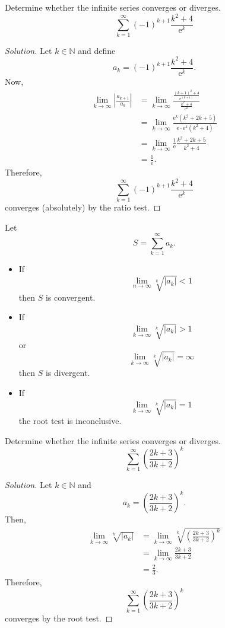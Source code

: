 \documentclass[compacto,10pt,comentarios]{aleph-notas}
\begin{document}
\begin{ejer}
    Determine whether the infinite series converges or diverges.
    $$
        \sum_{k=1}^{\infty} (-1)^{k+1} \frac{k^2+4}{\mathrm{e}^{k}}
    $$
\end{ejer}
\begin{proof}[Solution]
    Let $k \in \mathbb{N}$ and define
    $$
        a_k = (-1)^{k+1} \frac{k^2+4}{\mathrm{e}^{k}}.
    $$
    Now,
    \begin{align*}
        \lim_{k \to \infty} \left| \frac{a_{k+1}}{a_k} \right| 
        & = \lim_{k \to \infty} \frac{\frac{(k+1)^2+4}{\mathrm{e}^{(k+1)}}}{\frac{k^2+4}{\mathrm{e}^{k}}} \\
        & = \lim_{k \to \infty} \frac{\mathrm{e}^{k} (k^2 + 2k + 5)}{\mathrm{e} \cdot \mathrm{e}^{k} (k^2 + 4)} \\
        & = \lim_{k \to \infty} \frac{1}{\mathrm{e}} \frac{k^2 + 2k + 5}{k^2 + 4} \\
        & = \frac{1}{\mathrm{e}}.
    \end{align*}
    Therefore,
    $$
        \sum_{k=1}^{\infty} (-1)^{k+1} \frac{k^2+4}{\mathrm{e}^{k}}
    $$
    converges (absolutely) by the ratio test.
\end{proof}

\begin{defi}
    Let 
    $$
        S = \sum_{k=1}^{\infty} a_k.
    $$
    \begin{itemize}
        \item If 
        $$
            \lim_{n\to\infty}\sqrt[k]{|a_k|} < 1
        $$ then $S$ is convergent.
        \item If
        $$
            \lim_{k \to \infty} \sqrt[k]{|a_k|} > 1
        $$ 
        or 
        $$
            \lim_{k \to \infty} \sqrt[k]{|a_k|}=\infty
        $$
        then $S$ is divergent.
        \item
        If 
            $$
                \lim_{k \to \infty} \sqrt[k]{|a_k|}=1
            $$
        the root test is inconclusive. 
\end{itemize}
\end{defi}

\begin{ejer}
    Determine whether the infinite series converges or diverges.
    $$
        \sum_{k=1}^{\infty} \left( \frac{2k + 3}{3 k + 2} \right) ^ {k}
    $$
\end{ejer}
\begin{proof}[Solution]
    Let $k \in \mathbb{N}$ and
    $$
        a_k = \left( \frac{2k + 3}{3 k + 2} \right) ^ {k}.
    $$
    Then,
    \begin{align*}
        \lim_{k \to \infty} \sqrt[k]{|a_k|}
        & = \lim_{k \to \infty} \sqrt[k]{\left( \frac{2k + 3}{3 k + 2} \right) ^ {k}} \\
        & = \lim_{k \to \infty} \frac{2k + 3}{3 k + 2} \\
        & = \frac{2}{3}.
    \end{align*}
    Therefore, 
    $$
        \sum_{k=1}^{\infty} \left( \frac{2k + 3}{3 k + 2} \right) ^ {k}
    $$
    converges by the root test.
\end{proof}
\end{document}
